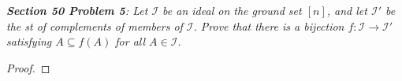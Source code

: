 \documentclass{article}
\begin{document}
\it \textbf{Section 50 Problem 5}: Let $\mathcal{I}$ be an ideal on the
  ground set $[n]$, and let $\mathcal{I}'$ be the st of complements of
  members of $\mathcal{I}$. Prove that there is a bijection
  $f:\mathcal{I}\rightarrow\mathcal{I}'$ satisfying $A\subseteq f(A)$ for
  all $A\in\mathcal{I}$.

  \begin{proof}
  \end{proof}
\end{document}
